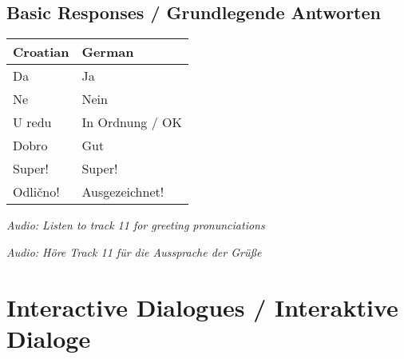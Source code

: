 \begin{vocabulary}
\subsection*{Basic Responses / Grundlegende Antworten}

\begin{center}
\begin{tabular}{ll}
\toprule
Croatian & German \\
\midrule
Da & Ja \\
Ne & Nein \\
U redu & In Ordnung / OK \\
Dobro & Gut \\
Super! & Super! \\
Odlično! & Ausgezeichnet! \\
\bottomrule
\end{tabular}
\end{center}

\textit{Audio: Listen to track 11 for greeting pronunciations}

\textit{Audio: Höre Track 11 für die Aussprache der Grüße}
\end{vocabulary}

\section{Interactive Dialogues / Interaktive Dialoge}

